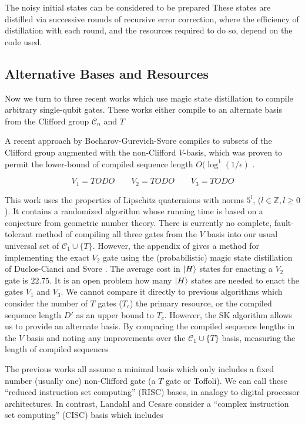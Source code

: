 The noisy initial states can be considered to be prepared
These states are distilled via successive rounds of recursive error
correction, where the efficiency of distillation with each round,
and the resources required to do so, depend on the code used.


\subsection{Alternative Bases and Resources}

Now we turn to three recent works which use magic state distillation to compile
arbitrary single-qubit gates. These works either compile to an alternate
basis from the Clifford group $\mathcal{C}_n$ and $T$

A recent approach by Bocharov-Gurevich-Svore \cite{Bocharov2013}
compiles to subsets of the Clifford group augmented with the non-Clifford
$V$-basis, which was proven to permit the lower-bound of compiled sequence length
$O(\log^1(1/\epsilon)$
\cite{Harrow2003}.

\begin{equation}
V_1 = TODO \qquad V_2 = TODO \qquad V_3 = TODO
\end{equation}

This work uses the properties of Lipschitz quaternions with norms $5^l$, ($l \in \mathbb{Z}, l \ge 0$). It
contains a randomized algorithm whose running time is based on a conjecture from geometric number theory.
There is currently no complete, fault-tolerant method of compiling all three gates from the $V$ basis into
our usual universal set of $\mathcal{C}_1 \cup \{T\}$. However, the appendix of \cite{Bocharov2013}
gives a method for implementing the exact $V_2$ gate using the (probabilistic) magic state distillation of
Duclos-Cianci and Svore \cite{DuclosCianci2012}. The average cost in $\left\vert{H}\right\rangle$
states for enacting a $V_2$ gate is $22.75$. It is an open problem how many
$\left\vert{H}\right\rangle$ states are needed to enact the gates $V_1$ and $V_3$.
We cannot compare it directly to previous algorithms which consider the number of $T$ gates ($T_c$)
the primary resource, or the compiled sequence length $D'$ as an upper bound to $T_c$.
However, the SK algorithm allows us to provide an alternate basis. By
comparing the compiled sequence lengths in the $V$ basis and noting any
improvements over the $\mathcal{C}_1 \cup \{T\}$ basis, 
measuring the length of compiled sequences 

The previous works all assume a minimal basis which only includes a fixed
number (usually one) non-Clifford gate (a $T$ gate or Toffoli). We can
call these ``reduced instruction set computing'' (RISC) bases, in analogy to
digital processor architectures.
In contrast, Landahl and
Cesare consider a ``complex instruction set computing'' (CISC) basis which
includes 
